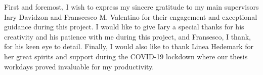 First and foremost, I wish to express my sincere gratitude to my main supervisors Iary Davidzon and Franscesco M. Valentino for their engagement and exceptional guidance during this project. I would like to give Iary a special thanks for his creativity and his patience with me during this project, and Fransesco, I thank, for his keen eye to detail. Finally, I would also like to thank Linea Hedemark for her great spirits and support during the COVID-19 lockdown where our thesis workdays proved invaluable for my productivity.
